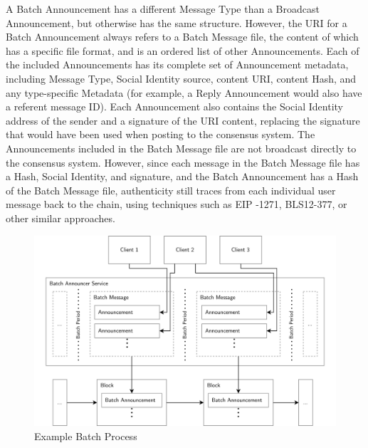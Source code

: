 \documentclass[12pt,letterpaper]{article}
\begin{document}
	A Batch Announcement has a different Message Type than a Broadcast Announcement, but
        otherwise has the same structure. However, the URI for a Batch Announcement always
        refers to a Batch Message file, the content of which has a specific file format, and
        is an ordered list of other Announcements. Each of the included Announcements has
        its complete set of Announcement metadata, including Message Type, Social Identity
        source, content URI, content Hash, and any type-specific Metadata (for example, a
        Reply Announcement would also have a referent message ID).  Each Announcement also
        contains the Social Identity address of the sender and a signature of the URI
        content, replacing the signature that would have been used when posting to the
        consensus system. The Announcements included in the Batch Message file are not
        broadcast directly to the consensus system. However, since each message in the Batch
        Message file has a Hash, Social Identity, and signature, and the Batch Announcement
        has a Hash of the Batch Message file, authenticity still traces from each individual
        user message back to the chain, using techniques such as EIP -1271,\cite{eip1271}
        BLS12-377,\cite{el2020} or other similar approaches.

	\begin{figure}
		\includegraphics[width=\linewidth]{figures/Example Batch Process.png}
		\caption{Example Batch Process}
		\label{fig:10}
	\end{figure}
\end{document}
